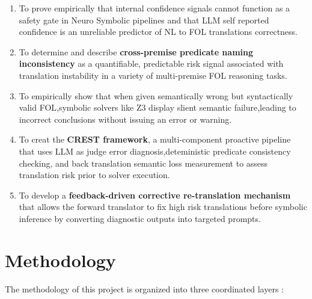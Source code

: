 \begin{enumerate}
    \item To prove empirically that internal confidence signals cannot function as a safety gate in Neuro Symbolic pipelines and that LLM self reported confidence is an unreliable predictor of NL to FOL translations correctness.

    \item To determine and describe \textbf{cross-premise predicate naming inconsistency} as a quantifiable, predictable risk signal associated with translation instability in a variety of  multi-premise FOL reasoning tasks.

    \item To empirically show that when given semantically wrong but syntactically valid FOL,symbolic solvers like Z3 display slient semantic failure,leading to incorrect conclusions without issuing an error or warning.  

    \item To creat the \textbf{CREST framework}, a multi-component proactive pipeline that uses LLM as judge error diagnosis,deteministic predicate consistency checking, and back translation semantic loss measurement to assess translation risk prior to solver execution.

    \item To develop a \textbf{feedback-driven corrective re-translation mechanism} that allows the forward translator to fix high risk translations before symbolic inference by converting diagnostic outputs into targeted prompts.
\end{enumerate}

\section{Methodology}

The methodology of this project is organized into three coordinated layers :

